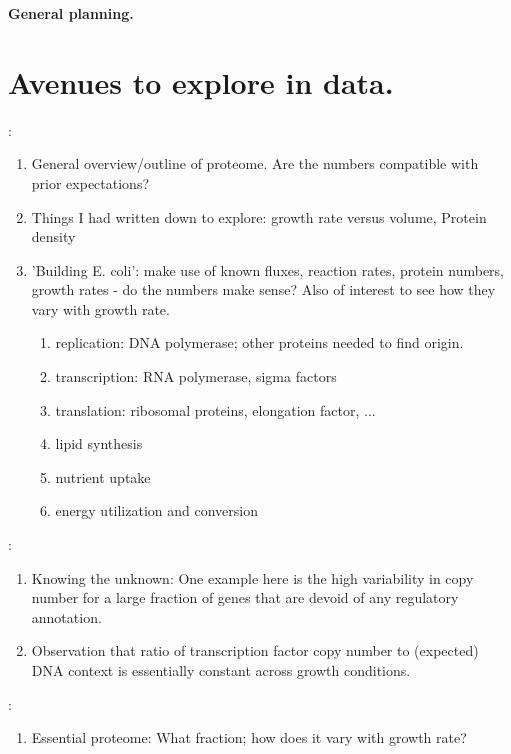 \documentclass[preprint,10pt]{elsarticle}
\date{}
\begin{document}
\begin{flushleft}
{\Large
\textbf{General planning.}
}\\
\end{flushleft}

\section*{Avenues to explore in data.}

:
\begin{enumerate}
  \item General overview/outline of proteome. Are the numbers compatible with prior expectations?
  \item Things I had written down to explore:  growth rate versus volume, Protein density
  \item 'Building E. coli': make use of known fluxes, reaction rates, protein numbers, growth rates -
  do the numbers make sense? Also of interest to see how they vary with growth rate.
  \begin{enumerate}
    \item replication: DNA polymerase; other proteins needed to find origin.
    \item transcription: RNA polymerase, sigma factors
    \item translation: ribosomal proteins, elongation factor, ...
    \item lipid synthesis
    \item nutrient uptake
    \item energy utilization and conversion
  \end{enumerate}
\end{enumerate}

:
\begin{enumerate}
  \item Knowing the unknown: One example here is the high variability in copy number for a
  large fraction of genes that are devoid of any regulatory annotation.
  \item Observation that ratio of transcription factor copy number to (expected) DNA context is
  essentially constant across growth conditions.
\end{enumerate}

:
\begin{enumerate}
  \item Essential proteome: What fraction; how does it vary with growth rate?
\end{enumerate}
\end{document}
